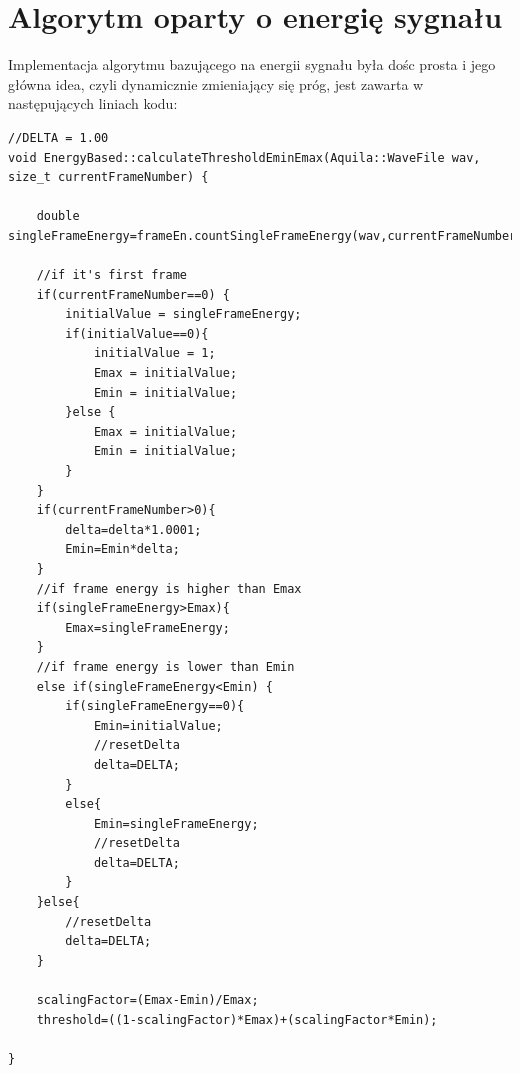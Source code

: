 \documentclass[eng,printmode]{mgr}
\begin{document}
\section{Algorytm oparty o energię sygnału}
Implementacja algorytmu bazującego na energii sygnału była dośc prosta i jego główna idea, czyli dynamicznie zmieniający się próg, jest zawarta w następujących liniach kodu:
\lstset{language=C++,basicstyle=\scriptsize}
\begin{lstlisting}
//DELTA = 1.00
void EnergyBased::calculateThresholdEminEmax(Aquila::WaveFile wav,
size_t currentFrameNumber) {
	
	double singleFrameEnergy=frameEn.countSingleFrameEnergy(wav,currentFrameNumber);
	
	//if it's first frame
	if(currentFrameNumber==0) {
		initialValue = singleFrameEnergy;
		if(initialValue==0){
			initialValue = 1;
			Emax = initialValue;
			Emin = initialValue;
		}else {
			Emax = initialValue;
			Emin = initialValue;
		}
	}	
	if(currentFrameNumber>0){
		delta=delta*1.0001;
		Emin=Emin*delta;
	}
	//if frame energy is higher than Emax
	if(singleFrameEnergy>Emax){
		Emax=singleFrameEnergy;
	}
	//if frame energy is lower than Emin
	else if(singleFrameEnergy<Emin) {
		if(singleFrameEnergy==0){
			Emin=initialValue;
			//resetDelta
			delta=DELTA;
		}
		else{
			Emin=singleFrameEnergy;
			//resetDelta
			delta=DELTA;
		}
	}else{
		//resetDelta
		delta=DELTA;
	}
	
	scalingFactor=(Emax-Emin)/Emax;
	threshold=((1-scalingFactor)*Emax)+(scalingFactor*Emin);

}
\end{lstlisting}\vspace{5mm}
\end{document}

